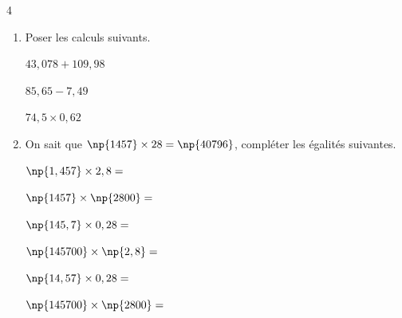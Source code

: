 \documentclass[a4paper]{book}
\begin{document}
{    \begin{exerciceNote}{4}
        \begin{enumerate}
            \item Poser les calculs suivants.

            \medskip
        
            \begin{minipage}{0.33\linewidth}
                \quad $43,078+109,98$
                \vspace{4cm}
            \end{minipage}
            \hfill\vline\hfill
            \begin{minipage}{0.33\linewidth}
                \quad $85,65-7,49$
                \vspace{4cm}
            \end{minipage}        
            \hfill\vline\hfill
            \begin{minipage}{0.33\linewidth}
                \quad $74,5 \times 0,62 $
                \vspace{4cm}
            \end{minipage}

            \item On sait que $\np{1457}\times28=\np{40796}$, compléter les égalités suivantes.

            \medskip
        
            \begin{minipage}{0.33\linewidth}
                $\np{1,457}\times2,8=$
                
                \bigskip
                
                 $\np{1457}\times\np{2800}=$
            \end{minipage}
            \hfill\vline\hfill
            \begin{minipage}{0.33\linewidth}
                \quad $\np{145,7}\times0,28=$
                
                \bigskip
                
                 \quad $\np{145700}\times\np{2,8}=$
            \end{minipage}        
            \hfill\vline\hfill
            \begin{minipage}{0.33\linewidth}
                \quad $\np{14,57}\times0,28=$
                
                \bigskip
                
                \quad $\np{145700}\times\np{2800}=$
            \end{minipage}
        \end{enumerate}
    \end{exerciceNote}
    

}
\end{document}
